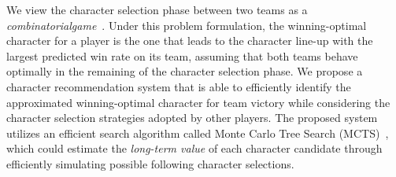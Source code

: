 

We view the character selection phase between two teams as a \textit{combinatorial\linebreak game}~\cite{browne2012survey}. Under this problem formulation, the winning-optimal character for a player is the one that leads to the character line-up with the largest predicted win rate on its team, assuming that both teams behave optimally in the remaining of the character selection phase.  We propose a character recommendation system that is able to efficiently identify the approximated winning-optimal character for team victory while considering the character selection strategies adopted by other players. The proposed system utilizes an efficient search algorithm called Monte Carlo Tree Search (MCTS)~\cite{kocsis2006bandit}, which could estimate the \textit{long-term value} of each character candidate through efficiently simulating possible following character selections. 

